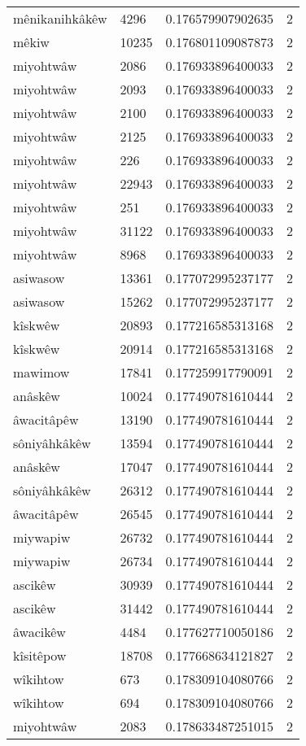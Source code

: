 \begin{longtable}{llll}
mênikanihkâkêw & 4296 & 0.176579907902635 & 2 \\
mêkiw & 10235 & 0.176801109087873 & 2 \\
miyohtwâw & 2086 & 0.176933896400033 & 2 \\
miyohtwâw & 2093 & 0.176933896400033 & 2 \\
miyohtwâw & 2100 & 0.176933896400033 & 2 \\
miyohtwâw & 2125 & 0.176933896400033 & 2 \\
miyohtwâw & 226 & 0.176933896400033 & 2 \\
miyohtwâw & 22943 & 0.176933896400033 & 2 \\
miyohtwâw & 251 & 0.176933896400033 & 2 \\
miyohtwâw & 31122 & 0.176933896400033 & 2 \\
miyohtwâw & 8968 & 0.176933896400033 & 2 \\
asiwasow & 13361 & 0.177072995237177 & 2 \\
asiwasow & 15262 & 0.177072995237177 & 2 \\
kîskwêw & 20893 & 0.177216585313168 & 2 \\
kîskwêw & 20914 & 0.177216585313168 & 2 \\
mawimow & 17841 & 0.177259917790091 & 2 \\
anâskêw & 10024 & 0.177490781610444 & 2 \\
âwacitâpêw & 13190 & 0.177490781610444 & 2 \\
sôniyâhkâkêw & 13594 & 0.177490781610444 & 2 \\
anâskêw & 17047 & 0.177490781610444 & 2 \\
sôniyâhkâkêw & 26312 & 0.177490781610444 & 2 \\
âwacitâpêw & 26545 & 0.177490781610444 & 2 \\
miywapiw & 26732 & 0.177490781610444 & 2 \\
miywapiw & 26734 & 0.177490781610444 & 2 \\
ascikêw & 30939 & 0.177490781610444 & 2 \\
ascikêw & 31442 & 0.177490781610444 & 2 \\
âwacikêw & 4484 & 0.177627710050186 & 2 \\
kîsitêpow & 18708 & 0.177668634121827 & 2 \\
wîkihtow & 673 & 0.178309104080766 & 2 \\
wîkihtow & 694 & 0.178309104080766 & 2 \\
miyohtwâw & 2083 & 0.178633487251015 & 2 \\

\end{longtable}
